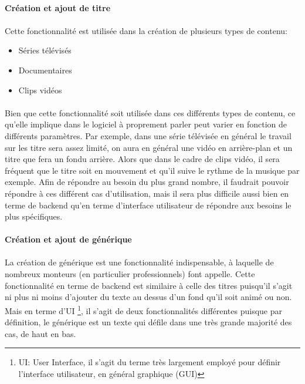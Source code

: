 \paragraph{Création et ajout de titre}
\paragraph{}
Cette fonctionnalité est utilisée dans la création de plusieurs types de contenu:
\begin{itemize}
  \item {Séries télévisés}
  \item {Documentaires}
  \item {Clips vidéos}
\end{itemize}

\paragraph{}
Bien que cette fonctionnalité soit utilisée dans ces différents types de contenu,
ce qu'elle implique dans le logiciel à proprement parler peut varier en fonction
de différents paramètres. Par exemple, dans une série télévisée en général le
travail sur les titre sera assez limité, on aura en général une vidéo en arrière-plan
et un titre que fera un fondu arrière. Alors que dans le cadre de clips vidéo,
il sera fréquent que le titre soit en mouvement et qu'il suive le rythme de la
musique par exemple. Afin de répondre au besoin du plus grand nombre, il faudrait
pouvoir répondre à ces différent cas d'utilisation, mais il sera plus difficile
aussi bien en terme de backend qu'en terme d'interface utilisateur de répondre
aux besoins le plus spécifiques.

\paragraph{Création et ajout de générique}
\paragraph{}
La création de générique est une fonctionnalité indispensable, à laquelle de
nombreux monteurs (en particulier professionnels) font appelle. Cette
fonctionnalité en terme de backend est similaire à
celle des titres puisqu'il s'agit ni plus ni moins d'ajouter du
texte au dessus d'un fond qu'il soit animé ou non. Mais en terme d'UI
\footnote{UI: User Interface, il s'agit du terme  très largement
employé pour définir l'interface utilisateur, en général graphique (GUI)},
il s'agit de deux fonctionnalités différentes puisque par définition,
le générique est un texte qui défile dans une très grande majorité
des cas, de haut en bas.

